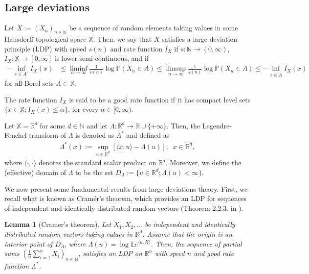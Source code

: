 \documentclass[10pt]{amsart}
\newtheorem{lemma}{Lemma}[section]
\newcounter{theor}
\def\R{\mathbb{R}}
\def\N{\mathbb{N}}
\def\E{\mathbb{E}}
\numberwithin{equation}{section}
\begin{document}
\subsection{Large deviations}
\label{Subsection:LargeDeviations}
Let $X := (X_n)_{n \in \N}$ be a sequence of random elements taking values in some Hausdorff topological space $\mathbb{X}$. Then, we say that $X$ satisfies a large deviation principle (LDP) with speed $s(n)$ and rate function $I_{X}$ if $s: \N \to (0, \infty)$, $I_{X}: \mathbb{X} \to [0, \infty]$ is lower semi-continuous, and if
\begin{align*}
- \inf _{x \in A^\circ } I_X (x) & \leq \liminf _{n \to \infty} \frac{1}{s(n)} \log \mathbb{P} (X_n \in A ) \leq \limsup _{n \to \infty} \frac{1}{s(n)} \log \mathbb{P} (X_n \in A ) \leq - \inf _{x \in \overline{ A} } I_X (x)
\end{align*}
for all Borel sets $A \subset \mathbb{X}$. 

The rate function $I_X$ is said to be a good rate function if it has compact level sets $\lbrace x \in \mathbb{X} ; I_X (x) \leq \alpha \rbrace$, for every $\alpha \in [0, \infty)$.

Let $\mathbb{X} = \R^d$ for some $d \in \N$ and let $\Lambda : \R^d \to \R \cup \lbrace +\infty \rbrace$. Then, the Legendre-Fenchel transform of $\Lambda$ is denoted as $\Lambda ^* $ and defined as
\begin{align*}
\Lambda^* (x) := \sup _{u \in \R^d} \left[ \langle x , u \rangle - \Lambda (u) \right], \; \; x \in \R^d,
\end{align*}
where $\langle \cdot , \cdot \rangle$ denotes the standard scalar product on $\R^d$. Moreover, we define the (effective) domain of $\Lambda$ to be the set $D_\Lambda := \lbrace u \in \R^d ; \Lambda (u) < \infty \rbrace$.

We now present some fundamental results from large deviations theory. First, we recall what is known as Cram\'er's theorem, which provides an LDP for sequences of independent and identically distributed random vectors (Theorem 2.2.3. in \cite{DZ}).
\begin{lemma}[Cramer's theorem]
Let $X_1,X_2,...$ be independent and identically distributed random vectors taking values in $\R^d$. Assume that the origin is an interior point of $D_\Lambda$, where $\Lambda (u) = \log \E e^{\langle u , X \rangle }$. Then, the sequence of partial sums $\left( \frac{1}{n} \sum _{i=1} ^n X_i \right)_{n \in \mathbb{N}}$, satisfies an LDP on $\R^n$ with speed $n$ and good rate function $\Lambda ^* $.
\end{lemma}
\end{document}
